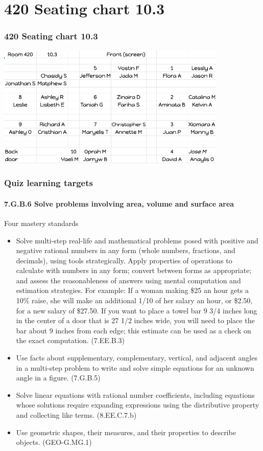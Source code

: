 \documentclass{beamer}
\begin{document}
  \section{420 Seating chart 10.3}
  \frame
  {
    \frametitle{420 Seating chart 10.3}
    \begin{center}
      \includegraphics[width=11cm]{10C_seating.png}
    \end{center}
  }

\frame
{
  \frametitle{Quiz learning targets}
  \framesubtitle{7.G.B.6 Solve problems involving area, volume and surface area}

  \begin{block}{Four mastery standards}
    \begin{itemize}
    \item Solve multi-step real-life and mathematical problems posed with positive and negative rational numbers in any form (whole numbers, fractions, and decimals), using tools strategically. Apply properties of operations to calculate with numbers in any form; convert between forms as appropriate; and assess the reasonableness of answers using mental computation and estimation strategies. For example: If a woman making \$25 an hour gets a 10\% raise, she will make an additional 1/10 of her salary an hour, or \$2.50, for a new salary of \$27.50. If you want to place a towel bar 9 3/4 inches long in the center of a door that is 27 1/2 inches wide, you will need to place the bar about 9 inches from each edge; this estimate can be used as a check on the exact computation. (7.EE.B.3)
        
    \item Use facts about supplementary, complementary, vertical, and adjacent angles in a multi-step problem to write and solve simple equations for an unknown angle in a figure. (7.G.B.5)
    
    \item Solve linear equations with rational number coefficients, including equations whose solutions require expanding expressions using the distributive property and collecting like terms. (8.EE.C.7.b)
    
    \item Use geometric shapes, their measures, and their properties to describe objects. (GEO-G.MG.1)
    \end{itemize}
  \end{block}
}
  
\end{document}
